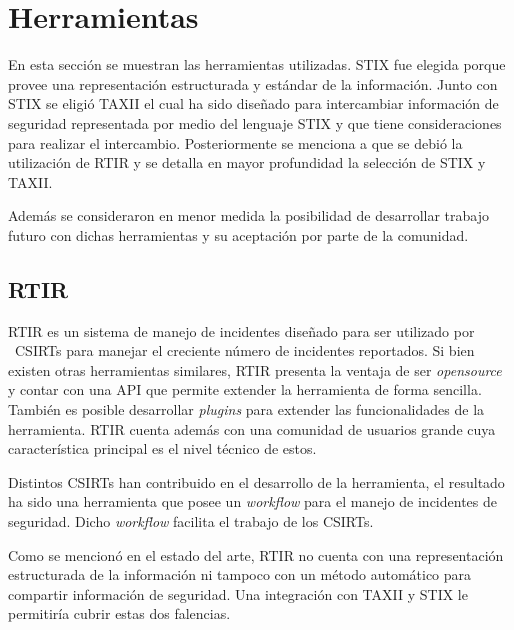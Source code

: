 \bigskip

\section{Herramientas}
{
	En esta sección se muestran las herramientas utilizadas. STIX fue elegida porque provee una representación estructurada
	y estándar de la información. Junto con STIX se eligió TAXII el cual ha sido diseñado para intercambiar información de
	seguridad representada por medio del lenguaje STIX y que tiene consideraciones para realizar el intercambio.
	Posteriormente se menciona a que se debió la utilización de RTIR y se detalla en mayor profundidad la selección de STIX
	y TAXII.}

{
	Además se consideraron en menor medida la posibilidad de desarrollar trabajo futuro con dichas herramientas y su
	aceptación por parte de la comunidad.}


\bigskip

\subsection{RTIR}

\bigskip

{
	RTIR es un sistema de manejo de incidentes diseñado para ser utilizado por \ CSIRTs para manejar el creciente número de
	incidentes reportados. Si bien existen otras herramientas similares, RTIR presenta la ventaja de ser
	\textit{opensource} y contar con una API que permite extender la herramienta de forma sencilla. También es posible
	desarrollar \textit{plugins} para extender las funcionalidades de la herramienta. RTIR cuenta además con una comunidad
	de usuarios grande cuya característica principal es el nivel técnico de estos.}

{
	Distintos CSIRTs han contribuido en el desarrollo de la herramienta, el resultado ha sido una herramienta que posee un
	\textit{workflow} para el manejo de incidentes de seguridad. Dicho \textit{workflow} facilita el trabajo de los
	CSIRTs.}

{
	Como se mencionó en el estado del arte, RTIR no cuenta con una representación estructurada de la información ni tampoco
	con un método automático para compartir información de seguridad. Una integración con TAXII y STIX le permitiría cubrir
	estas dos falencias.}


\bigskip

